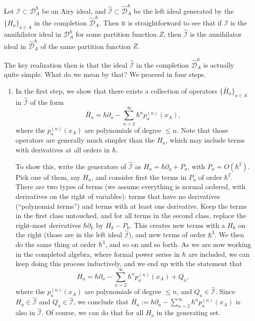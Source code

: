 \documentclass[reqno,oneside,11pt]{amsart}
\theoremstyle{plain}
\theoremstyle{definition}
\theoremstyle{remark}
\numberwithin{equation}{section}
\newcommand{\I}{\mathcal{I}}
\newcommand{\DAh}{\mathcal{D}_A^{\hbar}}
\newcommand{\DAhC}{\widehat{\mathcal{D}}_A^{\hbar}}
\begin{document}
Let $\I \subset \DAh$ be an Airy ideal, and $\widehat{\I} \subset \DAhC$ be the left ideal generated by the $\{H_a\}_{a \in A}$ in the completion $\DAhC$. Then it is straightforward to see that if $\I$ is the annihilator ideal in $\DAh$ for some partition function $Z$, then $\widehat{\I}$ is the annihilator ideal in $\DAhC$ of the same partition function $Z$.

The key realization then is that the ideal $\widehat{\I}$ in the completion $\DAhC$ is actually quite simple. What do we mean by that?  We proceed in four steps.

\begin{enumerate}
\item In the first step, we show that there exists a collection of operators $\{\bar{H}_a\}_{a\in A}$ in $\widehat{\I}$ of the form
\begin{equation}\label{eq:Hbar}
\bar{H}_a= \hbar \partial_a -\sum_{n=2}^\infty \hbar^n p_a^{(n)}(x_A) ,
\end{equation}
where the $p_a^{(n)}(x_A)$ are polynomials of degree $\leq n$. Note that those operators are generally much simpler than the $H_a$, which may include terms with derivatives at all orders in $\hbar$.

To show this, write the generators of $\widehat{\I}$ as $H_a = \hbar \partial_a + P_a$, with  $P_a = O (\hbar^2)$. Pick one of them, say $H_a$, and consider first the terms in $P_a$ of order $\hbar^2$. There are two types of terms (we assume everything is normal ordered, with derivatives on the right of variables): terms that have no derivatives (``polynomial terms'') and terms with at  least one derivative. Keep the terms in the first class untouched, and for all terms in the second class, replace the right-most derivatives $\hbar \partial_k$ by $H_k - P_k$. This creates new terms with a $H_k$ on the right (those are in the left ideal $\widehat{\I}$), and new terms of order $\hbar^3$. We then do the same thing at order $\hbar^3$, and so on and so forth. As we are now working in the completed algebra, where formal power series in $\hbar$ are included, we can keep doing this process inductively, and we end up with the statement that
\begin{equation}
H_a = \hbar \partial_a -\sum_{n=2}^\infty \hbar^n p_a^{(n)}(x_A) + Q_a,
\end{equation}
where the $p_a^{(n)}(x_A)$ are polynomials of degree $\leq n$, and $Q_a \in \widehat{\I}$. Since $H_a \in \widehat{\I}$ and $Q_a \in \widehat{\I}$, we conclude that $\bar{H}_a := \hbar \partial_a -\sum_{n=2}^\infty \hbar^n p_a^{(n)}(x_A) $ is also in $\widehat{\I}$. Of course, we can do that for all $H_a$ in the generating set.


\end{enumerate}
\end{document}

